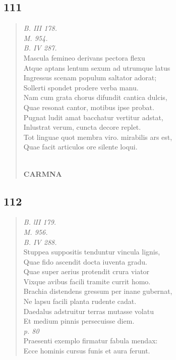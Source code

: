 \documentclass[11pt, a4paper]{report}
\begin{document}
            \subsection*{111}
      \begin{verse}
      \textit{B. III 178.} \\ \textit{M. 954.} \\ \textit{B. IV 287.} \\ Mascula femineo derivans pectora flexu \\ Atque aptans lentum sexum ad utrumque latus \\ Ingressus scenam populum saltator adorat; \\ Sollerti spondet prodere verba manu. \\ Nam cum grata chorus difundit cantica dulcis, \\ Quae resonat cantor, motibus ipse probat. \\ Pugnat ludit amat bacchatur vertitur adstat, \\ Inlustrat verum, cuncta decore replet. \\ Tot linguae quot membra viro. mirabilis ars est, \\ Quae facit articulos ore silente loqui. \\ 
        ﻿\pagebreak 
    \begin{center} \textbf{CARMNA} \end{center} \marginpar{[130]} 
      \end{verse}
  
            \subsection*{112}
      \begin{verse}
      \textit{B. lII 179.} \\ \textit{M. 956.} \\ \textit{B. IV 288.} \\ Stuppea suppositis tenduntur vincula lignis, \\ Quae fido ascendit docta iuventa gradu. \\ Quae super aerius protendit crura viator \\ Vixque avibus facili tramite currit homo. \\ Brachia distendens gressum per inane gubernat, \\ Ne lapsu facili planta rudente cadat. \\ Daedalus adstruitur terras mutasse volatu \\ Et medium pinnis persecuisse diem. \\ \textit{p. 80} \\ Praesenti exemplo firmatur fabula mendax: \\ Ecce hominis cursus funis et aura ferunt. \\ 
      \end{verse}
  
\end{document}

